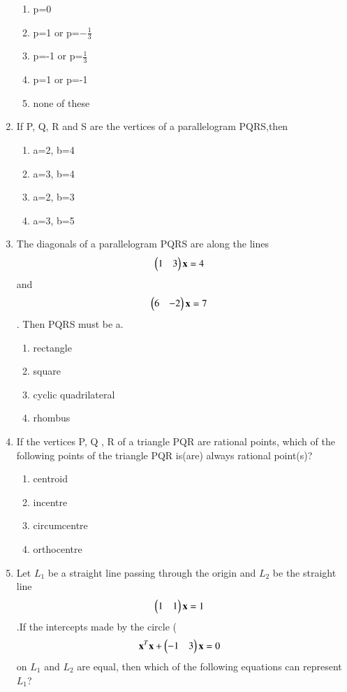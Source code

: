 \begin{enumerate}
    \begin{enumerate}
     \item  p=0
     \item  p=1 or p=$-\frac{1}{3}$
     \item  p=-1 or p=$\frac{1}{3}$
     \item  p=1 or p=-1
     \item none of these
     \end{enumerate}
    \item If P, Q, R and S are the vertices of a parallelogram PQRS,then
    \begin{enumerate}
     \item  a=2, b=4
     \item  a=3, b=4
     \item  a=2, b=3
     \item  a=3, b=5
     \end{enumerate}
    \item The diagonals of a parallelogram PQRS are along the lines \begin{align}\begin{pmatrix}1 & 3\end{pmatrix} \mathbf {x} &= 4\end{align} and \begin{align}\begin{pmatrix}6 & -2\end{pmatrix} \mathbf {x} &= 7\end{align}. Then PQRS must be a.
    \begin{enumerate}
     \item  rectangle
     \item  square
     \item  cyclic quadrilateral
     \item  rhombus
     \end{enumerate}
    \item If the vertices P, Q , R of a triangle PQR are rational points, which of the following points of the triangle PQR is(are) always rational point(s)?
    \begin{enumerate}
     \item  centroid
     \item  incentre
     \item  circumcentre
     \item  orthocentre
     \end{enumerate}
    \item Let $L_1$ be a straight line passing through the origin and $L_2$ be the straight line \begin{align}\begin{pmatrix}1 & 1\end{pmatrix} \mathbf {x} &= 1\end{align}.If the intercepts made by the circle  (\begin{align}\mathbf{x}^T\mathbf{x} + \begin{pmatrix}-1 & 3\end{pmatrix} \mathbf {x} &= 0\end{align} on $L_1$ and $L_2$ are equal, then which of the following equations can represent $L_1$?

\end{enumerate}
